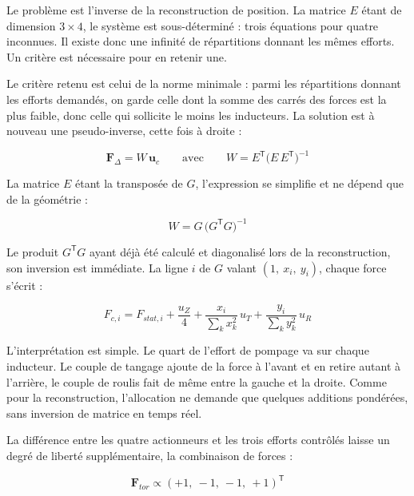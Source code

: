 Le problème est l'inverse de la reconstruction de position. La matrice $E$ étant de dimension $3\times4$, le système est sous-déterminé : trois équations pour quatre inconnues. Il existe donc une infinité de répartitions donnant les mêmes efforts. Un critère est nécessaire pour en retenir une.

Le critère retenu est celui de la norme minimale : parmi les répartitions donnant les efforts demandés, on garde celle dont la somme des carrés des forces est la plus faible, donc celle qui sollicite le moins les inducteurs. La solution est à nouveau une pseudo-inverse, cette fois à droite :

\begin{equation}
    \boldsymbol F_\Delta = W\,\boldsymbol u_c \qquad \text{avec} \qquad W = E^{\mathsf T}\bigl(E\,E^{\mathsf T}\bigr)^{-1}
    \label{eq:W-def}
\end{equation}

La matrice $E$ étant la transposée de $G$, l'expression se simplifie et ne dépend que de la géométrie :

\begin{equation}
    W = G\,\bigl(G^{\mathsf T}G\bigr)^{-1}
\end{equation}

Le produit $G^{\mathsf T}G$ ayant déjà été calculé et diagonalisé lors de la reconstruction, son inversion est immédiate. La ligne $i$ de $G$ valant $(1,\ x_i,\ y_i)$, chaque force s'écrit :

\begin{equation}
    F_{c,i} = F_{stat,i} + \frac{u_Z}{4} + \frac{x_i}{\sum_k x_k^2}\,u_T + \frac{y_i}{\sum_k y_k^2}\,u_R
    \label{eq:allocation-explicite}
\end{equation}

L'interprétation est simple. Le quart de l'effort de pompage va sur chaque inducteur. Le couple de tangage ajoute de la force à l'avant et en retire autant à l'arrière, le couple de roulis fait de même entre la gauche et la droite. Comme pour la reconstruction, l'allocation ne demande que quelques additions pondérées, sans inversion de matrice en temps réel.

La différence entre les quatre actionneurs et les trois efforts contrôlés laisse un degré de liberté supplémentaire, la combinaison de forces :

\begin{equation}
    \boldsymbol F_{tor} \propto (+1,\ -1,\ -1,\ +1)^{\mathsf T}
\end{equation}

